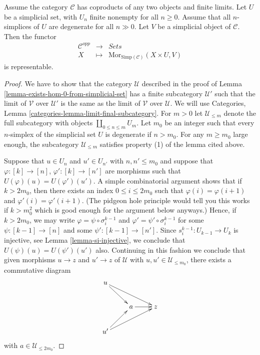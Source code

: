 \begin{lemma}
\label{lemma-exists-hom-0-from-simplicial-set-finite}
Assume the category $\mathcal{C}$
has coproducts of any two objects and finite
limits. Let $U$ be a simplicial set, with $U_n$ finite nonempty
for all $n \geq 0$. Assume that all $n$-simplices
of $U$ are degenerate for all $n \gg 0$.
Let $V$ be a simplicial object of $\mathcal{C}$.
Then the functor
\begin{eqnarray*}
\mathcal{C}^{opp} & \longrightarrow & \textit{Sets} \\
X
& \longmapsto &
\text{Mor}_{\text{Simp}(\mathcal{C})}(X \times U, V)
\end{eqnarray*}
is representable.
\end{lemma}

\begin{proof}
We have to show that the category $\mathcal{U}$ described
in the proof of Lemma \ref{lemma-exists-hom-0-from-simplicial-set}
has a finite subcategory $\mathcal{U}'$ such that the limit
of $\mathcal{V}$ over $\mathcal{U}'$ is the same as the
limit of $\mathcal{V}$ over $\mathcal{U}$. We will use
Categories, Lemma \ref{categories-lemma-limit-final-subcategory}.
For $m > 0$ let $\mathcal{U}_{\leq m}$ denote the full
subcategory with objects $\coprod_{0 \leq n \leq m} U_m$.
Let $m_0$ be an integer such that every $n$-simplex
of the simplicial set $U$ is degenerate if $n > m_0$.
For any $m \geq m_0$ large enough, the subcategory
$\mathcal{U}_{\leq m}$ satisfies property (1) of the lemma
cited above.

\medskip\noindent
Suppose that $u \in U_n$ and
$u' \in U_{n'}$ with $n, n' \leq m_0$ and suppose that
$\varphi : [k] \to [n]$, $\varphi' : [k] \to [n']$
are morphisms such that $U(\varphi)(u) = U(\varphi')(u')$.
A simple combinatorial argument shows that if $k > 2m_0$,
then there exists an index $0 \leq i \leq 2m_0$ such that
$\varphi(i) =\varphi(i + 1)$ and $\varphi'(i) = \varphi'(i + 1)$.
(The pidgeon hole principle would tell you this works if
$k > m_0^2$ which is good enough for the argument below
anyways.) Hence, if $k > 2m_0$, we may write
$\varphi = \psi \circ \sigma^{k - 1}_i$ and
$\varphi' = \psi' \circ \sigma^{k - 1}_i$ for some
$\psi : [k - 1] \to [n]$ and some $\psi' : [k - 1] \to [n']$.
Since $s^{k - 1}_i : U_{k - 1} \to U_k$ is injective,
see Lemma \ref{lemma-si-injective}, we conclude that
$U(\psi)(u) = U(\psi')(u')$ also. Continuing in this
fashion we conclude that given morphisms
$u \to z$ and $u' \to z$ of $\mathcal{U}$
with $u, u' \in \mathcal{U}_{\leq m_0}$, there exists
a commutative diagram
$$
\xymatrix{
u \ar[rd] \ar[rrd] & & \\
& a \ar[r] & z \\
u' \ar[ru] \ar[rru] 
}
$$
with $a \in \mathcal{U}_{\leq 2m_0}$.


\end{proof}
